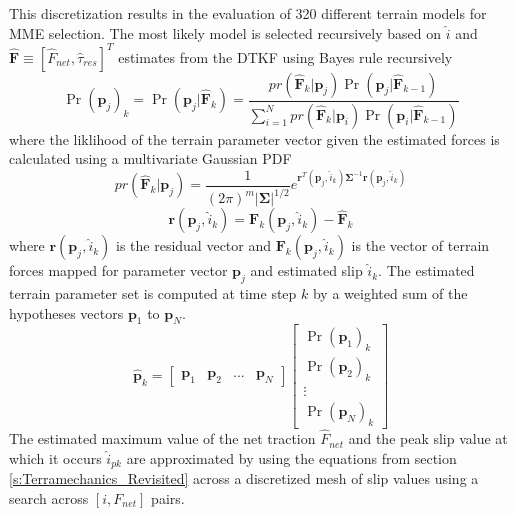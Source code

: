 This discretization results in the evaluation of 320 different terrain models for MME selection. The most likely model is selected recursively based on $\hat{i}$ and $\hat{\mathbf{F}} \equiv [\hat{F}_{net},\hat{\tau}_{res}]^T$ estimates from the DTKF using Bayes rule recursively
\begin{equation}
    \Pr(\mathbf{p}_j)_k = \Pr(\mathbf{p}_j|\hat{\mathbf{F}}_k) = \frac{pr(\hat{\mathbf{F}}_k|\mathbf{p}_j)\Pr(\mathbf{p}_j|\hat{\mathbf{F}}_{k-1})}{\sum_{i=1}^{N} pr(\hat{\mathbf{F}}_k|\mathbf{p}_i)\Pr(\mathbf{p}_i|\hat{\mathbf{F}}_{k-1})}
\end{equation}
where the liklihood of the terrain parameter vector given the estimated forces is calculated using a multivariate Gaussian PDF
\begin{equation}\label{eq:liklihood}
    pr(\hat{\mathbf{F}}_k|\mathbf{p}_j) = \frac{1}{(2\pi)^m|\mathbf{\Sigma}|^{1/2}}e^{\mathbf{r}^T(\mathbf{p}_j,\hat{i}_k) \mathbf{\Sigma}^{-1}\mathbf{r}(\mathbf{p}_j,\hat{i}_k) }
\end{equation}
\begin{equation}\label{eq:residual}
    \mathbf{r}(\mathbf{p}_j,\hat{i}_k) = \mathbf{F}_k(\mathbf{p}_j,\hat{i}_k)-\hat{\mathbf{F}}_k
\end{equation}
where $\mathbf{r}(\mathbf{p}_j,\hat{i}_k)$ is the residual vector and $\mathbf{F}_k(\mathbf{p}_j,\hat{i}_k)$ is the vector of terrain forces mapped for parameter vector $\mathbf{p}_j$ and estimated slip $\hat{i}_k$. The estimated terrain parameter set is computed at time step $k$ by a weighted sum of the hypotheses vectors $\mathbf{p}_1$ to $\mathbf{p}_N$.
\begin{equation}
    \hat{\mathbf{p}}_k = \begin{bmatrix} \mathbf{p}_1 & \mathbf{p}_2 & ... & \mathbf{p}_N\end{bmatrix} \begin{bmatrix} \Pr(\mathbf{p}_1)_k \\ \Pr(\mathbf{p}_2)_k \\ \vdots \\ \Pr(\mathbf{p}_N)_k \end{bmatrix}
\end{equation} 
The estimated maximum value of the net traction $\hat{F}_{net}$ and the peak slip value at which it occurs $\hat{i}_{pk}$ are approximated by using the equations from section \ref{s:Terramechanics_Revisited} across a discretized mesh of slip values using a search across $[i,F_{net}]$ pairs.

